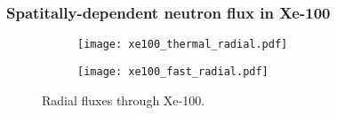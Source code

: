 \begin{frame}
    \frametitle{Spatitally-dependent neutron flux in Xe-100}
    \begin{figure}
        \centering 
        \begin{subfigure}{0.49\textwidth}
            \texttt{[image: xe100\_thermal\_radial.pdf]}
        \end{subfigure}
        \begin{subfigure}{0.49\textwidth}
            \texttt{[image: xe100\_fast\_radial.pdf]}
        \end{subfigure}
        \caption{Radial fluxes through Xe-100.}
        \label{fig:xe100-flux}
    \end{figure}
\end{frame}